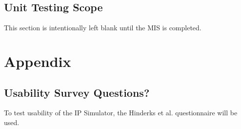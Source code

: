 \documentclass[12pt, titlepage]{article}
\begin{document}
\subsection{Unit Testing Scope}
This section is intentionally left blank until the MIS is completed.

				




\newpage

\section{Appendix\label{appendix}}

\subsection{Usability Survey Questions?}
To test usability of the IP Simulator, the Hinderks et al. questionnaire \cite{hinderks_schrepp_thomaschewski} will be used.
\newpage{}
\end{document}
